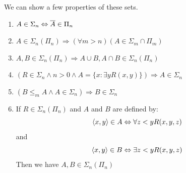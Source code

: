 \documentclass[../main.tex]{subfiles}
\begin{document}
We can show a few properties of these sets.
\begin{prop}
	\begin{enumerate}
		\item $A\in\Sigma_n\Leftrightarrow\overline A\in\Pi_n$
		\item $A\in\Sigma_n (\Pi_n)\Rightarrow(\forall
			m>n)(A\in\Sigma_m\cap\Pi_m)$
		\item $A,B\in\Sigma_n(\Pi_n)\Rightarrow A\cup B,A\cap
			B\in\Sigma_n(\Pi_n)$
		\item $(R\in \Sigma_n\wedge n>0\wedge A=\{x:\exists y
			R(x,y)\})\Rightarrow A\in\Sigma_n$
		\item $(B\leq_m A\wedge A\in\Sigma_n)\Rightarrow B\in \Sigma_n$
		\item If $R\in\Sigma_n(\Pi_n)$ and $A$ and $B$ are defined by:
			$$\langle x,y\rangle \in A \Leftrightarrow \forall z<y
			R(x,y,z)$$
			and
			$$\langle x,y\rangle \in B \Leftrightarrow \exists z<y
			R(x,y,z)$$
			Then we have $A,B\in\Sigma_n(\Pi_n)$
	\end{enumerate}
\end{prop}
\end{document}
